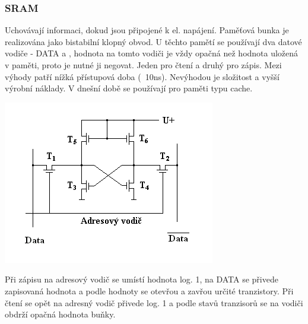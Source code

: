\subsubsection{SRAM}
\begin{multicols}{2}
    Uchovávají informaci, dokud jsou připojené k el. napájení.
    Paměťová bunka je realizována jako bistabilní klopný obvod.
    U těchto pamětí se používají dva datové vodiče - DATA a , hodnota na tomto vodiči je vždy opačná než hodnota uložená v paměti, proto je nutné ji negovat.
    Jeden pro čtení a druhý pro zápis.
    Mezi výhody patří nížká přístupová doba (~10ns).
    Nevýhodou je složitost a vyšší výrobní náklady.
    V dnešní době se používají pro paměti typu cache.
    \columnbreak

    \includegraphics[width=0.8\linewidth]{TVY-POS/Polovodicove-pameti/SRAMM.png}
\end{multicols}
Při zápisu na adresový vodič se umístí hodnota log. 1, na DATA se přivede zapisovaná hodnota a podle hodnoty se otevřou a zavřou určité tranzistory.
Při čtení se opět na adresný vodič přivede log. 1 a podle stavů tranzisorů se na vodiči  obdrží opačná hodnota buňky.
